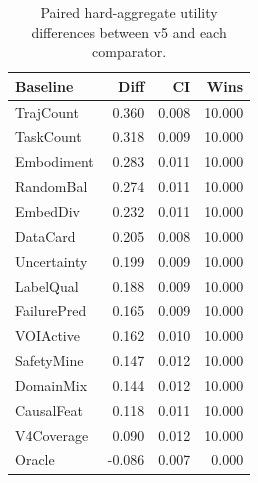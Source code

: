 \begin{table}[t]
\centering
\caption{Paired hard-aggregate utility differences between v5 and each comparator.}
\label{tab:pairwise}
\begin{tabular}{lrrr}
\toprule
Baseline & Diff & CI & Wins \\
\midrule
TrajCount & 0.360 & 0.008 & 10.000 \\
TaskCount & 0.318 & 0.009 & 10.000 \\
Embodiment & 0.283 & 0.011 & 10.000 \\
RandomBal & 0.274 & 0.011 & 10.000 \\
EmbedDiv & 0.232 & 0.011 & 10.000 \\
DataCard & 0.205 & 0.008 & 10.000 \\
Uncertainty & 0.199 & 0.009 & 10.000 \\
LabelQual & 0.188 & 0.009 & 10.000 \\
FailurePred & 0.165 & 0.009 & 10.000 \\
VOIActive & 0.162 & 0.010 & 10.000 \\
SafetyMine & 0.147 & 0.012 & 10.000 \\
DomainMix & 0.144 & 0.012 & 10.000 \\
CausalFeat & 0.118 & 0.011 & 10.000 \\
V4Coverage & 0.090 & 0.012 & 10.000 \\
Oracle & -0.086 & 0.007 & 0.000 \\
\bottomrule
\end{tabular}
\end{table}

